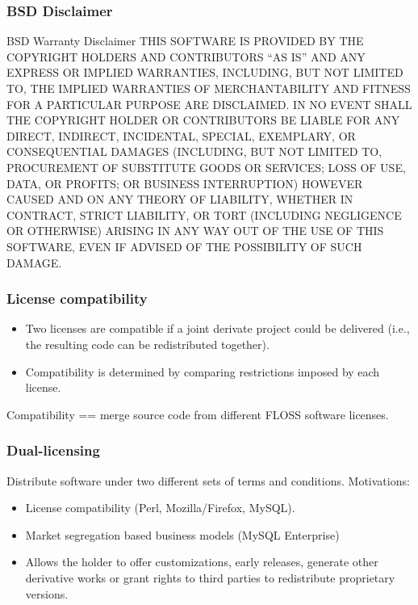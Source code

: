 \begin{frame}
\frametitle{BSD Disclaimer}

\begin{block}{BSD Warranty Disclaimer}
\small{THIS SOFTWARE IS PROVIDED BY THE COPYRIGHT HOLDERS AND CONTRIBUTORS ``AS IS'' AND ANY EXPRESS OR IMPLIED WARRANTIES, INCLUDING, BUT NOT LIMITED TO, THE IMPLIED WARRANTIES OF MERCHANTABILITY AND FITNESS FOR A PARTICULAR PURPOSE ARE DISCLAIMED. IN NO EVENT SHALL THE COPYRIGHT HOLDER OR CONTRIBUTORS BE LIABLE FOR ANY DIRECT, INDIRECT, INCIDENTAL, SPECIAL, EXEMPLARY, OR CONSEQUENTIAL DAMAGES (INCLUDING, BUT NOT LIMITED TO, PROCUREMENT OF SUBSTITUTE GOODS OR SERVICES; LOSS OF USE, DATA, OR PROFITS; OR BUSINESS INTERRUPTION) HOWEVER CAUSED AND ON ANY THEORY OF LIABILITY, WHETHER IN CONTRACT, STRICT LIABILITY, OR TORT (INCLUDING NEGLIGENCE OR OTHERWISE) ARISING IN ANY WAY OUT OF THE USE OF THIS SOFTWARE, EVEN IF ADVISED OF THE POSSIBILITY OF SUCH DAMAGE.}
\end{block}

\end{frame}




\begin{frame}
\frametitle{License compatibility}

\begin{itemize}
\item Two licenses are compatible if a joint derivate project could be delivered (i.e., the resulting code can be redistributed together).
\item Compatibility is determined by comparing restrictions imposed by each license.
\end{itemize}

Compatibility == merge source code from different FLOSS software licenses.

\end{frame}


\begin{frame}
\frametitle{Dual-licensing}

Distribute software under two different sets of terms and conditions. Motivations:

\begin{itemize}
\item License compatibility (Perl, Mozilla/Firefox, MySQL).
\item Market segregation based business models (MySQL Enterprise)
\item Allows the holder to offer customizations, early releases, generate other derivative works or grant rights to third parties to redistribute proprietary versions.
\end{itemize}

                                                 
\end{frame}


